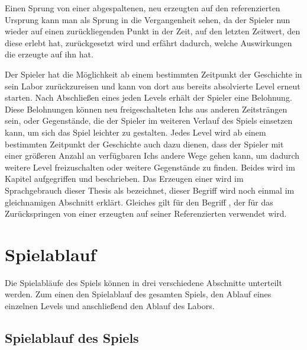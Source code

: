 Einen Sprung von einer abgespaltenen, neu erzeugten  auf den referenzierten Ursprung kann man als Sprung in die Vergangenheit sehen, da der Spieler nun wieder auf einen zurückliegenden Punkt in der Zeit, auf den letzten Zeitwert, den diese  erlebt hat, zurückgesetzt wird und erfährt dadurch, welche Auswirkungen die erzeugte  auf ihn hat.

Der Spieler hat die Möglichkeit ab einem bestimmten Zeitpunkt der Geschichte in sein Labor zurückzureisen und kann von dort aus bereits absolvierte Level erneut starten. Nach Abschließen eines jeden Levels erhält der Spieler eine Belohnung. Diese Belohnungen können neu freigeschalteten Ichs aus anderen Zeitsträngen sein, oder Gegenstände, die der Spieler im weiteren Verlauf des Spiels einsetzen kann, um sich das Spiel leichter zu gestalten. Jedes Level wird ab einem bestimmten Zeitpunkt der Geschichte auch dazu dienen, dass der Spieler mit einer größeren Anzahl an verfügbaren Ichs andere Wege gehen kann, um dadurch weitere Level freizuschalten oder weitere Gegenstände zu finden. Beides wird im Kapitel  aufgegriffen und beschrieben.
Das Erzeugen einer  wird im Sprachgebrauch dieser Thesis als  bezeichnet, dieser Begriff wird noch einmal im gleichnamigen Abschnitt erklärt. Gleiches gilt für den Begriff , der für das Zurückspringen von einer erzeugten  auf seiner Referenzierten  verwendet wird.

\section{Spielablauf}
Die Spielabläufe des Spiels können in drei verschiedene Abschnitte unterteilt werden. Zum einen den Spielablauf des gesamten Spiels, den Ablauf eines einzelnen Levels und anschließend den Ablauf des Labors.

\subsection{Spielablauf des Spiels}

